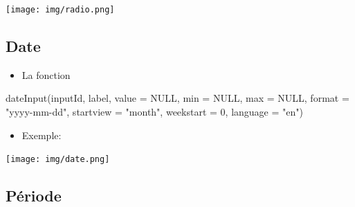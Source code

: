 \documentclass[
]{article}
\newenvironment{Shaded}{\begin{snugshade}}{\end{snugshade}}
\newcommand{\AttributeTok}[1]{\textcolor[rgb]{0.77,0.63,0.00}{#1}}
\newcommand{\CommentTok}[1]{\textcolor[rgb]{0.56,0.35,0.01}{\textit{#1}}}
\newcommand{\ConstantTok}[1]{\textcolor[rgb]{0.00,0.00,0.00}{#1}}
\newcommand{\DecValTok}[1]{\textcolor[rgb]{0.00,0.00,0.81}{#1}}
\newcommand{\FunctionTok}[1]{\textcolor[rgb]{0.00,0.00,0.00}{#1}}
\newcommand{\NormalTok}[1]{#1}
\newcommand{\StringTok}[1]{\textcolor[rgb]{0.31,0.60,0.02}{#1}}
\providecommand{\tightlist}{%
  \setlength{\itemsep}{0pt}\setlength{\parskip}{0pt}}
\begin{document}
\texttt{[image: img/radio.png]}

\hypertarget{date}{%
\subsection{Date}\label{date}}

\begin{itemize}
\tightlist
\item
  La fonction
\end{itemize}

\begin{Shaded}
\begin{Highlighting}[]
\FunctionTok{dateInput}\NormalTok{(inputId, label, }\AttributeTok{value =} \ConstantTok{NULL}\NormalTok{, }\AttributeTok{min =} \ConstantTok{NULL}\NormalTok{, }\AttributeTok{max =} \ConstantTok{NULL}\NormalTok{, }\AttributeTok{format =} \StringTok{"yyyy{-}mm{-}dd"}\NormalTok{, }
          \AttributeTok{startview =} \StringTok{"month"}\NormalTok{, }\AttributeTok{weekstart =} \DecValTok{0}\NormalTok{, }\AttributeTok{language =} \StringTok{"en"}\NormalTok{)}
\end{Highlighting}
\end{Shaded}

\begin{itemize}
\tightlist
\item
  Exemple:
\end{itemize}

\begin{Shaded}
\end{Shaded}

\texttt{[image: img/date.png]}

\hypertarget{puxe9riode}{%
\subsection{Période}\label{puxe9riode}}
\end{document}
